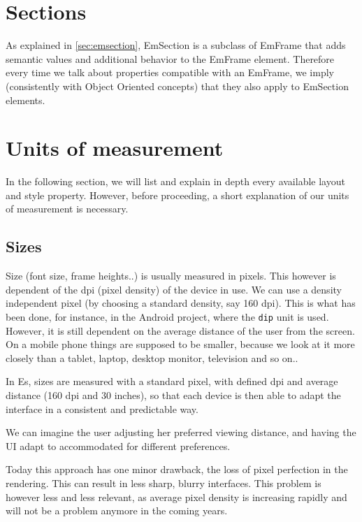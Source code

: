 \section{Sections}

As explained in \ref{sec:emsection}, EmSection is a subclass of EmFrame that adds semantic values and additional behavior to the EmFrame element. Therefore every time we talk about properties compatible with an EmFrame, we imply (consistently with Object Oriented concepts) that they also apply to EmSection elements.

\section{Units of measurement}
\label{ex:units}

In the following section, we will list and explain in depth every available layout and style property. However, before proceeding, a short explanation of our units of measurement is necessary.

\subsection{Sizes}

Size (font size, frame heights..) is usually measured in pixels. This however is dependent of the dpi (pixel density) of the device in use. We can use a density independent pixel (by choosing a standard density, say 160 dpi). This is what has been done, for instance, in the Android project, where the \verb|dip| unit is used. However, it is still dependent on the average distance of the user from the screen. On a mobile phone things are supposed to be smaller, because we look at it more closely than a tablet, laptop, desktop monitor, television and so on..

In Es, sizes are measured with a standard pixel, with defined dpi and average distance (160 dpi and 30 inches), so that each device is then able to adapt the interface in a consistent and predictable way.

We can imagine the user adjusting her preferred viewing distance, and having the UI adapt to accommodated for different preferences.

Today this approach has one minor drawback, the loss of pixel perfection in the rendering. This can result in less sharp, blurry interfaces. This problem is however less and less relevant, as average pixel density is increasing rapidly and will not be a problem anymore in the coming years.

